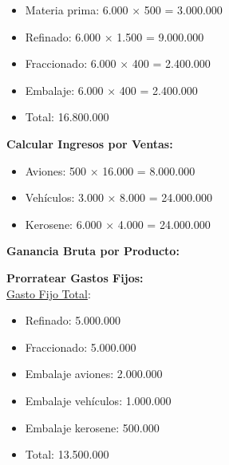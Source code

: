 \documentclass[10pt,a4paper]{article}
\begin{document}
\begin{enumerate}
\begin{itemize}
        \item Materia prima: 6.000 × 500 = 3.000.000
        \item Refinado: 6.000 × 1.500 = 9.000.000
        \item Fraccionado: 6.000 × 400 = 2.400.000
        \item Embalaje: 6.000 × 400 = 2.400.000 \\
        \item Total: 16.800.000\\

    \end{itemize}

    \textbf{Calcular Ingresos por Ventas:}

    \begin{itemize}

        \item Aviones: 500 × 16.000 = 8.000.000
        \item Vehículos: 3.000 × 8.000 = 24.000.000
        \item Kerosene: 6.000 × 4.000 = 24.000.000 \\

    \end{itemize}

    \textbf{Ganancia Bruta por Producto:}

    \begin{center}
    \end{center}
    
    \clearpage

    \textbf{Prorratear Gastos Fijos:} \\

    \underline{Gasto Fijo Total}:

    \begin{itemize}

        \item Refinado: 5.000.000
        \item Fraccionado: 5.000.000
        \item Embalaje aviones: 2.000.000
        \item Embalaje vehículos: 1.000.000
        \item Embalaje kerosene: 500.000 \\
        \item Total: 13.500.000 \\


\end{itemize}
\end{enumerate}
\end{document}
